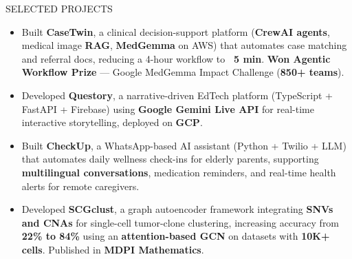 \documentclass{resume} %
\begin{document}
\begin{rSection}{SELECTED PROJECTS}
\vspace{-0.125em}

\begin{itemize}
    \itemsep -3pt {}
    \item Built \textbf{CaseTwin}, a clinical decision-support platform (\textbf{CrewAI agents}, medical image \textbf{RAG}, \textbf{MedGemma} on AWS) that automates case matching and referral docs, reducing a 4-hour workflow to \textbf{~5 min}. \textbf{Won Agentic Workflow Prize} — Google MedGemma Impact Challenge (\textbf{850+ teams}).

    \item Developed \textbf{Questory}, a narrative-driven EdTech platform (TypeScript + FastAPI + Firebase) using \textbf{Google Gemini Live API} for real-time interactive storytelling, deployed on \textbf{GCP}.

    \item Built \textbf{CheckUp}, a WhatsApp-based AI assistant (Python + Twilio + LLM) that automates daily wellness check-ins for elderly parents, supporting \textbf{multilingual conversations}, medication reminders, and real-time health alerts for remote caregivers.

    \item Developed \textbf{SCGclust}, a graph autoencoder framework integrating \textbf{SNVs and CNAs} for single-cell tumor-clone clustering, increasing accuracy from \textbf{22\% to 84\%} using an \textbf{attention-based GCN} on datasets with \textbf{10K+ cells}. Published in \textbf{MDPI Mathematics}.

\end{itemize}

\end{rSection}

\end{document}
